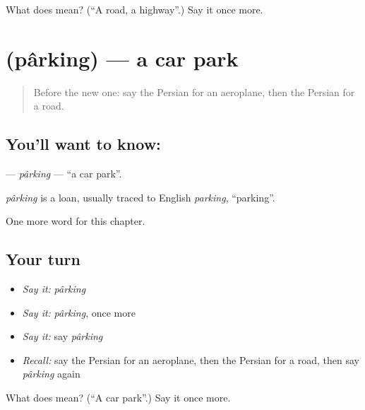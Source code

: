 \begin{tcolorbox}[breakable,colback=teal!4,colframe=teal!35!black,title={Before you move on}]
What does  mean? (\textquotedblleft{}A road, a highway\textquotedblright{}.) Say it once more.
\end{tcolorbox}
\section[\texorpdfstring{\fa{پارکینگ} (pârking)}{پارکینگ (pârking)}]{ (pârking) — a car park}

\label{lesson:FA-C118-parking}



\begin{quote}
Before the new one: say the Persian for an aeroplane, then the Persian for a road.
\end{quote}

\subsection*{You'll want to know: }
\textbf{} — \emph{pârking} — \textquotedblleft{}a car park\textquotedblright{}.

\begin{cousinweb}
\emph{pârking} is a loan, usually traced to English \emph{parking}, \textquotedblleft{}parking\textquotedblright{}.
\end{cousinweb}

\begin{grammarlens}[title={What you've built}]
One more word for this chapter.
\end{grammarlens}

\subsection*{Your turn}
\begin{itemize}
\raggedright
  \item \emph{Say it:} \emph{pârking}
  \item \emph{Say it:} \emph{pârking}, once more
  \item \emph{Say it:} say \emph{pârking}
  \item \emph{Recall:} say the Persian for an aeroplane, then the Persian for a road, then say \emph{pârking} again
\end{itemize}

\begin{tcolorbox}[breakable,colback=teal!4,colframe=teal!35!black,title={Before you move on}]
What does  mean? (\textquotedblleft{}A car park\textquotedblright{}.) Say it once more.
\end{tcolorbox}
